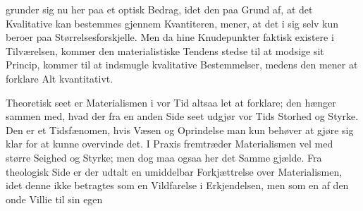 \documentclass[12pt,a4paper,openany]{book}
\newcommand{\opage}[1]{\marginnote{\footnotesize\textit{[#1]}}}
\begin{document}
\opage{198}grunder sig nu her paa et optisk Bedrag, idet den paa
Grund af, at det Kvalitative kan bestemmes gjennem Kvantiteren,
mener, at det i sig selv kun beroer paa Størrelsesforskjelle.
Men da hine Knudepunkter faktisk existere i
Tilværelsen, kommer den materialistiske Tendens stedse til at
modsige sit Princip, kommer til at indsmugle kvalitative
Bestemmelser, medens den mener at forklare Alt kvantitativt.

Theoretisk seet er Materialismen i vor Tid altsaa let
at forklare; den hænger sammen med, hvad der fra en anden
Side seet udgjør vor Tids Storhed og Styrke. Den er et
Tidsfænomen, hvis Væsen og Oprindelse man kun behøver
at gjøre sig klar for at kunne overvinde det. I Praxis
fremtræder Materialismen vel med større Seighed og Styrke;
men dog maa ogsaa her det Samme gjælde. Fra theologisk
Side er der udtalt en umiddelbar Forkjættrelse over Materialismen,
idet denne ikke betragtes som en Vildfarelse i Erkjendelsen,
men som en af den onde Villie til sin egen
\end{document}
